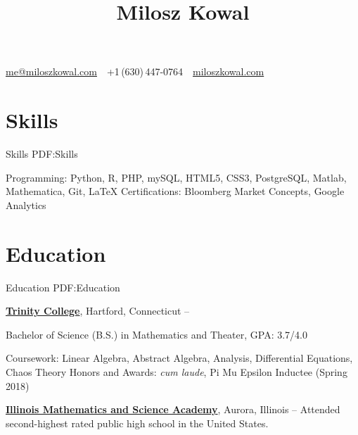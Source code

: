 \documentclass[letterpaper,10pt,oneside]{article}
\newcommand{\CVAuthor}{Milosz Kowal}
\newcommand{\CVWebpage}{https://miloszkowal.com}
\begin{document}

\title{\CVAuthor}

\begin{subtitle}
\par
\href{mailto:me@miloszkowal.com}
{me@miloszkowal.com}
\,\SubBulletSymbol\,
+1\,(630)\,447-0764
\,\SubBulletSymbol\,
\href{\CVWebpage}
{miloszkowal.com}
\end{subtitle}

\begin{body}


\section
{Skills}
{Skills}
{PDF:Skills}

Programming: Python, R, PHP, mySQL, HTML5, CSS3, PostgreSQL, Matlab, Mathematica, Git, \LaTeX \hfill\break
Certifications: Bloomberg Market Concepts, Google Analytics



\noindent\hrulefill
\section
{Education}
{Education}
{PDF:Education}

\href{http://www.trincoll.edu}
{\textbf{Trinity College}},
Hartford, Connecticut
\hfill
{} --

\GapNoBreak
\BulletItem
Bachelor of Science (B.S.) in
Mathematics and Theater, GPA: 3.7/4.0
\begin{detail}
\SubBulletItem
Coursework: Linear Algebra, Abstract Algebra, Analysis, Differential Equations, Chaos Theory
\SubBulletItem
Honors and Awards: \textit{cum laude}, Pi Mu Epsilon Inductee (Spring 2018)
\end{detail}

\GapNoBreak
\href{http://www.imsa.edu}
{\textbf{Illinois Mathematics and Science Academy}},
Aurora, Illinois
\hfill
{} --
\GapNoBreak
\BulletItem
Attended second-highest rated public high school in the United States.



\end{body}
\end{document}
